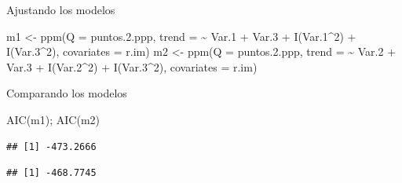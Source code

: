 \documentclass[
  11pt,
  ignorenonframetext,
]{beamer}
\newenvironment{Shaded}{}{}
\newcommand{\AttributeTok}[1]{\textcolor[rgb]{0.49,0.56,0.16}{#1}}
\newcommand{\DecValTok}[1]{\textcolor[rgb]{0.25,0.63,0.44}{#1}}
\newcommand{\FloatTok}[1]{\textcolor[rgb]{0.25,0.63,0.44}{#1}}
\newcommand{\FunctionTok}[1]{\textcolor[rgb]{0.02,0.16,0.49}{#1}}
\newcommand{\NormalTok}[1]{#1}
\newcommand{\OtherTok}[1]{\textcolor[rgb]{0.00,0.44,0.13}{#1}}
\newcommand{\SpecialCharTok}[1]{\textcolor[rgb]{0.25,0.44,0.63}{#1}}
\begin{document}
\begin{frame}[fragile]{Ajustando los modelos}
\protect\hypertarget{ajustando-los-modelos}{}
\begin{Shaded}
\begin{Highlighting}[]
\NormalTok{m1 }\OtherTok{\textless{}{-}} \FunctionTok{ppm}\NormalTok{(}\AttributeTok{Q =}\NormalTok{ puntos.}\FloatTok{2.}\NormalTok{ppp,}
          \AttributeTok{trend =} \SpecialCharTok{\textasciitilde{}}\NormalTok{ Var}\FloatTok{.1} \SpecialCharTok{+}\NormalTok{ Var}\FloatTok{.3} \SpecialCharTok{+} \FunctionTok{I}\NormalTok{(Var}\FloatTok{.1}\SpecialCharTok{\^{}}\DecValTok{2}\NormalTok{) }\SpecialCharTok{+} \FunctionTok{I}\NormalTok{(Var}\FloatTok{.3}\SpecialCharTok{\^{}}\DecValTok{2}\NormalTok{),}
          \AttributeTok{covariates =}\NormalTok{ r.im)}
\NormalTok{m2 }\OtherTok{\textless{}{-}} \FunctionTok{ppm}\NormalTok{(}\AttributeTok{Q =}\NormalTok{ puntos.}\FloatTok{2.}\NormalTok{ppp,}
          \AttributeTok{trend =} \SpecialCharTok{\textasciitilde{}}\NormalTok{ Var}\FloatTok{.2} \SpecialCharTok{+}\NormalTok{ Var}\FloatTok{.3} \SpecialCharTok{+} \FunctionTok{I}\NormalTok{(Var}\FloatTok{.2}\SpecialCharTok{\^{}}\DecValTok{2}\NormalTok{) }\SpecialCharTok{+} \FunctionTok{I}\NormalTok{(Var}\FloatTok{.3}\SpecialCharTok{\^{}}\DecValTok{2}\NormalTok{),}
          \AttributeTok{covariates =}\NormalTok{ r.im)}
\end{Highlighting}
\end{Shaded}
\end{frame}

\begin{frame}[fragile]{Comparando los modelos}
\protect\hypertarget{comparando-los-modelos}{}
\begin{Shaded}
\begin{Highlighting}[]
\FunctionTok{AIC}\NormalTok{(m1); }\FunctionTok{AIC}\NormalTok{(m2)}
\end{Highlighting}
\end{Shaded}

\begin{verbatim}
## [1] -473.2666
\end{verbatim}

\begin{verbatim}
## [1] -468.7745
\end{verbatim}
\end{frame}
\end{document}
